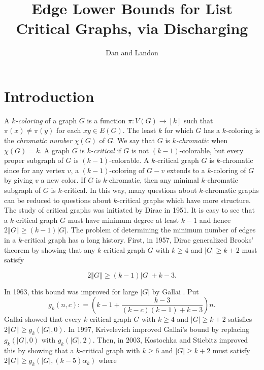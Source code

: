 \documentclass[12pt]{article}
\title{Edge Lower Bounds for List Critical Graphs, via Discharging}
\author{Dan and Landon}
\theoremstyle{plain}
\theoremstyle{definition}
\theoremstyle{remark}
\newcommand{\fancy}[1]{\mathcal{#1}}
\newcommand{\T}{\fancy{T}}
\newcommand{\card}[1]{\left|#1\right|}
\newcommand{\size}[1]{\left\Vert#1\right\Vert}
\newcommand{\func}[3]{#1\colon #2 \rightarrow #3}
\newcommand{\irange}[1]{\left[#1\right]}
\newcommand{\parens}[1]{\left( #1 \right)}
\newcommand{\DefinedAs}{\mathrel{\mathop:}=}
\begin{document}
\maketitle

\section{Introduction}

A \emph{$k$-coloring} of a graph $G$ is a function $\func{\pi}{V(G)}{\irange{k}}$ such that $\pi(x) \ne \pi(y)$ for each $xy \in E(G)$.  The least $k$ for which $G$ has a $k$-coloring is the \emph{chromatic number} $\chi(G)$ of $G$. We say that $G$ is \emph{$k$-chromatic} when $\chi(G) = k$.  A graph $G$ is \emph{$k$-critical} if $G$ is not $(k-1)$-colorable, but every proper subgraph of $G$ is $(k-1)$-colorable. A $k$-critical graph $G$ is $k$-chromatic since for any vertex $v$, a $(k-1)$-coloring of $G-v$ extends to a $k$-coloring of $G$ by giving $v$ a new color.  If $G$ is $k$-chromatic, then any minimal $k$-chromatic subgraph of $G$ is $k$-critical.  In this way, many questions about $k$-chromatic graphs can be reduced to questions about $k$-critical graphs which have more structure.  The study of critical graphs was initiated by Dirac \cite{dirac1951note} in 1951.  It is easy to see that a $k$-critical graph $G$ must have minimum degree at least $k-1$ and hence $2\size{G} \ge (k-1)\card{G}$.  The problem of determining the minimum number of edges in a $k$-critical graph has a long history. First, in 1957, Dirac \cite{dirac1957theorem} generalized Brooks' theorem \cite{brooks1941colouring} by showing that any $k$-critical graph $G$ with $k \ge 4$ and $\card{G} \ge k+2$ must satisfy 

\[2\size{G} \ge (k-1)\card{G} + k-3.\]

In 1963, this bound was improved for large $\card{G}$ by Gallai \cite{gallai1963kritische}.  Put 
\[g_k(n, c) \DefinedAs \parens{k-1 + \frac{k-3}{(k-c)(k-1) + k-3}}n.\]
Gallai showed that every $k$-critical graph $G$ with $k \ge 4$ and $\card{G} \ge k+2$ satisfies $2\size{G} \ge g_k(\card{G}, 0)$.  In 1997, Krivelevich \cite{krivelevich1997minimal} improved Gallai's bound by replacing $g_k(\card{G}, 0)$ with $g_k(\card{G}, 2)$.  Then, in 2003, Kostochka and Stiebitz \cite{kostochkastiebitzedgesincriticalgraph} improved this by showing that a $k$-critical graph with $k \ge 6$ and $\card{G} \ge k+2$ must satisfy $2\size{G} \ge g_k(\card{G}, (k-5)\alpha_k)$ where
\end{document}
